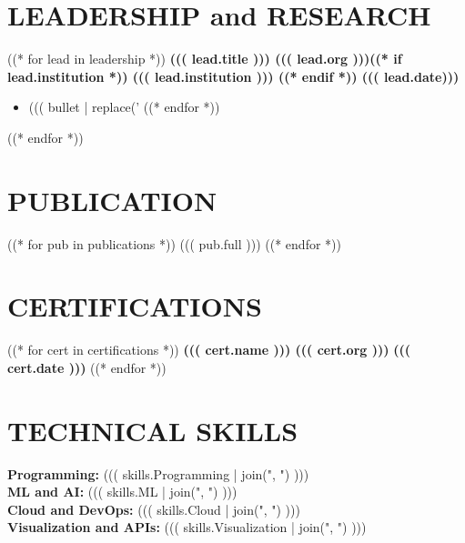 \documentclass[10pt]{article}
\begin{document}
\vspace{-0.4cm}
\section*{LEADERSHIP and RESEARCH}
\vspace{-0.1cm}
((* for lead in leadership *))
\noindent
\textbf{((( lead.title ))) \textbar{} ((( lead.org )))((* if lead.institution *)) \textbar{} ((( lead.institution ))) ((* endif *)) \hfill ((( lead.date)))} \\
\vspace{-0.4cm}
\begin{itemize}[leftmargin=0.6cm, itemsep=-0.1cm, topsep=0cm]
((* for bullet in lead.bullets *))
    \item ((( bullet | replace('%
((* endfor *))
\end{itemize}
((* endfor *))

\vspace{-0.4cm} 
\section*{PUBLICATION} 
\vspace{-0.2cm}
((* for pub in publications *))
\noindent
\noindent ((( pub.full )))
((* endfor *))

\vspace{-0.4cm} 
\section*{CERTIFICATIONS} 
\vspace{-0.2cm}
((* for cert in certifications *))
\noindent
\textbf{((( cert.name ))) \textbar{} ((( cert.org ))) } \hfill \textbf{((( cert.date ))) }
((* endfor *))

\vspace{-0.4cm} 
\section*{TECHNICAL SKILLS} 
\vspace{-0.2cm}
\noindent
\textbf{Programming:} ((( skills.Programming | join(", ") ))) \\
\textbf{ML and AI:} ((( skills.ML | join(", ") ))) \\
\textbf{Cloud and DevOps:} ((( skills.Cloud | join(", ") ))) \\
\textbf{Visualization and APIs:} ((( skills.Visualization | join(", ") )))
\end{document}
